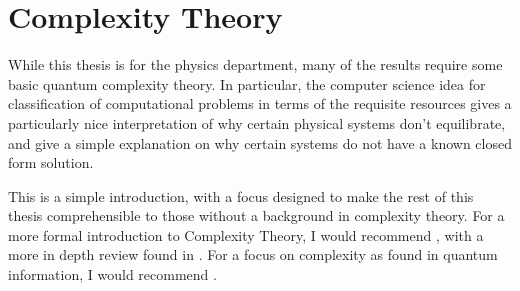 \documentclass[../thesis-main/thesis-main]{subfiles}
\begin{document}
%
%
%
%

\section{Complexity Theory}
\label{sec:complexity_theory}

While this thesis is for the physics department, many of the results require some basic quantum complexity theory.  In particular, the computer science idea for classification of computational problems in terms of the requisite resources gives a particularly nice interpretation of why certain physical systems don't equilibrate, and give a simple explanation on why certain systems do not have a known closed form solution.

This is a simple introduction, with a focus designed to make the rest of this thesis comprehensible to those without a background in complexity theory.  For a more formal introduction to Complexity Theory, I would recommend \cite{SipserToC}, with a more in depth review found in \cite{ABCC}.  For a focus on complexity as found in quantum information, I would recommend \cite{Wat09}.
\end{document}
